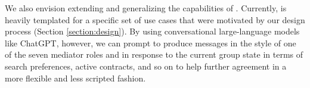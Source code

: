 We also envision extending and generalizing the capabilities of \cbot. 
Currently, \cbot is heavily templated for a specific set of use cases that were motivated by our design process (Section \ref{section:design}). By using conversational large-language models like ChatGPT, however, we can prompt \cbot to produce messages in the style of one of the seven mediator roles and in response to the current group state in terms of search preferences, active contracts, and so on to help further agreement in a more flexible and less scripted fashion.  
